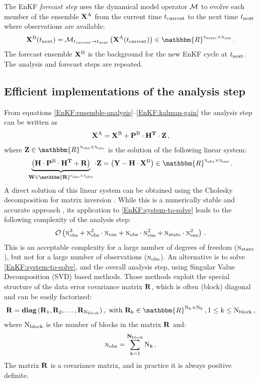 \documentclass[12pt]{article}
\newcommand{\Nobs}{\textsc{n}_{{\rm obs}}}
\newcommand{\Nens}{\textsc{n}_{{\rm ens}}}
\newcommand{\Nstate}{\textsc{n}_{{\rm state}}}
\newcommand{\BO}{{\mathcal O}}
\newcommand{\XA}{{\bf X}^{\rm A}}
\newcommand{\XB}{{\bf X}^{\rm B}}
\newcommand{\PB}{{\bf P}^{\rm B}}
\newcommand{\R}{{\bf R}}
\newcommand{\Z}{{\bf Z}}
\newcommand{\Y}{{\bf Y}}
\newcommand{\Mo}{{\cal M}}
\newcommand{\Lo}{{\bf H}}
\renewcommand{\Re}{\mathbbm{R}}
\newcommand{\N}{{\bf N}}
\renewcommand{\k}{{\rm k}}
\newcommand{\diag}[2]{{\bf diag} \left ( #1_{1}, #1_{2}, \ldots ,  #1_{#2}\right )}
\begin{document}
The EnKF {\em forecast step} uses the dynamical model operator $\Mo$ to evolve each member of the ensemble 
$\XA$ from the current time $t_{\rm current}$ to the next time $t_{\rm next}$ where observations are available:
\begin{eqnarray} 
\label{forecast-step}
\displaystyle {\XB}(t_{\rm next}) = {\Mo}_{t_{\rm current} \rightarrow t_{\rm next}} \left ( {\XA}(t_{\rm current})\right ) \in \Re^{\Nstate \times \Nens}\,.
\end{eqnarray}
The forecast ensemble ${\XB}$ is the background for the new EnKF cycle at $t_{\rm next}$. The analysis and forecast steps are repeated.

\subsection{Efficient implementations of the analysis step}
\label{enkf-analysis}


From equations \eqref{EnKF:ensemble-analysis}--\eqref{EnKF:kalman-gain} the analysis step can be written as 
\begin{eqnarray}
\label{EnKF:analysis-rewritten}
\XA= \XB + {\PB}  \cdot {\Lo}^{{\bf T}} \cdot \Z\,,
\end{eqnarray}
where $\Z \in \Re^{\Nobs \times \Nens}$ is the solution of the following linear system:
\begin{eqnarray}
\label{EnKF:system-to-solve}
\displaystyle \underbrace{\left ( {\Lo}  \cdot \PB \cdot {\Lo}^{{\bf T}} + \R \right )}_{\bf W \in \Re^{\Nobs \times \Nobs}} \cdot \Z = \left ( {{\Y}-{\Lo}  \cdot {\XB}} \right ) \in \Re^{\Nobs \times \Nens}\,.
\end{eqnarray}
A direct solution of this linear system can be obtained using the Cholesky decomposition for matrix inversion \cite{Lin99,Sch90,Xia10}. 
While this is a numerically stable and accurate approach  \cite{Gill96,Mei83,Ste97}, its application to \eqref{EnKF:system-to-solve} leads to the following complexity \cite{Jan06} of the analysis step:
\begin{eqnarray}
\label{EnKF:overall-complexity}
\BO \left( \Nobs^3 + \Nobs^2 \cdot \Nens + \Nobs \cdot \Nens^2 + \Nstate \cdot \Nens^2 \right )\,.
\end{eqnarray}
This is an acceptable complexity for a large number of degrees of freedom ($\Nstate$), but not for a large number of observations ($\Nobs$). An alternative is to solve \eqref{EnKF:system-to-solve}, and the overall analysis step, using Singular Value Decomposition (SVD) based methods. Those methods exploit the special structure of the data error covariance matrix $\R$, which is often (block) diagonal
and can be easily factorized:
\begin{eqnarray} \nonumber
\displaystyle \R = \diag{\R}{\rm N_{block}}, \text{ with $\R_{\k} \in \Re^{\rm N_{\k} \times N_{\k}}$}\, , 1 \le \k \le {\rm N_{\rm block}}\,,
\end{eqnarray}
where $\rm N_{block}$ is the number of blocks in the matrix $\R$ and:
\begin{eqnarray*}
\displaystyle \Nobs = \sum_{\k = 1}^{\N_{\rm block}} {\rm N_{\k}}\,.
\end{eqnarray*}
The matrix $\R$ is a covariance matrix, and in practice it is always positive definite.
\end{document}
